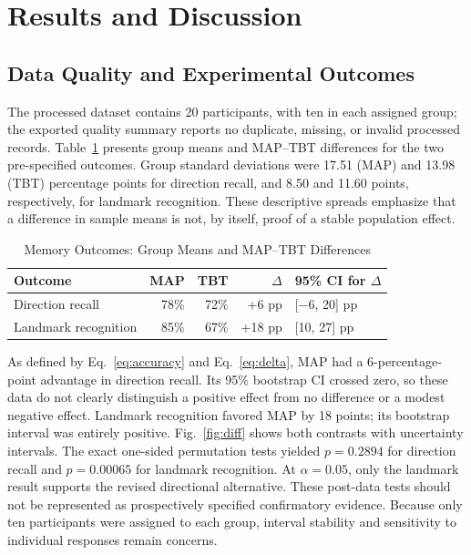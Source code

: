 \section{Results and Discussion}\label{sec:results}
\subsection{Data Quality and Experimental Outcomes}
The processed dataset contains 20 participants, with ten in each assigned group; the exported quality summary reports no duplicate, missing, or invalid processed records. Table~\ref{tab:memory} presents group means and MAP--TBT differences for the two pre-specified outcomes. Group standard deviations were 17.51 (MAP) and 13.98 (TBT) percentage points for direction recall, and 8.50 and 11.60 points, respectively, for landmark recognition. These descriptive spreads emphasize that a difference in sample means is not, by itself, proof of a stable population effect.

\begin{table}[t]
\caption{Memory Outcomes: Group Means and MAP--TBT Differences}\label{tab:memory}
\centering\footnotesize
\begin{tabular}{lrrrl}\toprule
Outcome & MAP & TBT & $\Delta$ & 95\% CI for $\Delta$\\\midrule
Direction recall & 78\% & 72\% & +6 pp & [$-6$, 20] pp\\
Landmark recognition & 85\% & 67\% & +18 pp & [10, 27] pp\\\bottomrule
\end{tabular}
\end{table}

As defined by Eq.~\ref{eq:accuracy} and Eq.~\ref{eq:delta}, MAP had a 6-percentage-point advantage in direction recall. Its 95\% bootstrap CI crossed zero, so these data do not clearly distinguish a positive effect from no difference or a modest negative effect. Landmark recognition favored MAP by 18 points; its bootstrap interval was entirely positive. Fig.~\ref{fig:diff} shows both contrasts with uncertainty intervals. The exact one-sided permutation tests yielded $p=0.2894$ for direction recall and $p=0.00065$ for landmark recognition. At $\alpha=0.05$, only the landmark result supports the revised directional alternative. These post-data tests should not be represented as prospectively specified confirmatory evidence. Because only ten participants were assigned to each group, interval stability and sensitivity to individual responses remain concerns.

